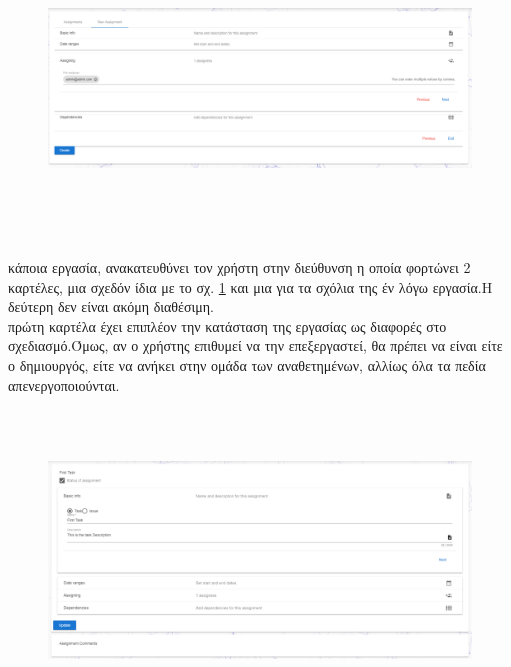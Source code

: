 \begin{figure}[!htb]
\includegraphics[width=\linewidth, height=8cm]{images/projectCreateAssignment.png}
\caption{}
\label{fig:projectCreateAssignment}
\end{figure}

 κάποια εργασία, ανακατευθύνει τον χρήστη στην διεύθυνση  η οποία φορτώνει 2 καρτέλες, μια σχεδόν ίδια με το σχ. \ref{fig:projectCreateAssignment} και μια για τα σχόλια της έν λόγω εργασία.Η δεύτερη δεν είναι ακόμη διαθέσιμη.\\
 πρώτη καρτέλα έχει επιπλέον την κατάσταση της εργασίας ως διαφορές στο σχεδιασμό.Όμως, αν ο χρήστης επιθυμεί να την επεξεργαστεί, θα πρέπει να είναι είτε ο δημιουργός, είτε να ανήκει στην ομάδα των αναθετημένων, αλλίως όλα τα πεδία απενεργοποιούνται.

\begin{figure}[!htb]
\includegraphics[width=\linewidth, height=8cm]{images/projectAssignementView.png}
\caption{}
\label{fig:projectAssignmentView}
\end{figure}

